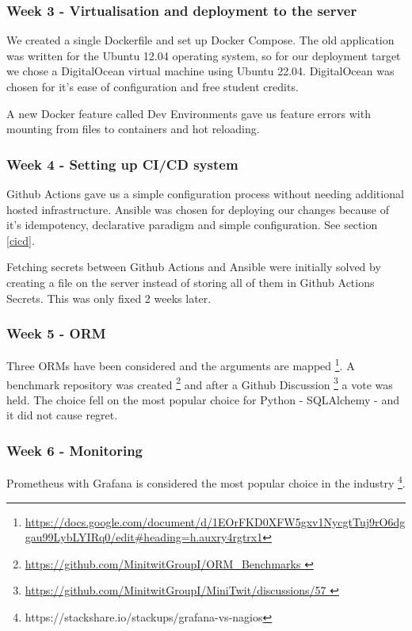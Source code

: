 \documentclass{article}
\begin{document}
\subsubsection{Week 3 - Virtualisation and deployment to the server}

We created a single Dockerfile and set up Docker Compose. The old application was written for the Ubuntu 12.04 operating system, so for our deployment target we chose a DigitalOcean virtual machine using Ubuntu 22.04. DigitalOcean was chosen for it's ease of configuration and free student credits.

A new Docker feature called Dev Environments gave us feature errors with mounting from files to containers and hot reloading.

\subsubsection{Week 4 - Setting up CI/CD system }

Github Actions gave us a simple configuration process without needing additional hosted infrastructure. Ansible was chosen for deploying our changes because of it's idempotency, declarative paradigm and simple configuration.
See section \ref{cicd}. 

Fetching secrets between Github Actions and Ansible were initially solved by creating a file on the server instead of storing all of them in Github Actions Secrets. This was only fixed 2 weeks later.

\subsubsection{Week 5 - ORM }

Three ORMs have been considered and the arguments are mapped \footnote{\url{https://docs.google.com/document/d/1EOrFKD0XFW5gxv1NycgtTuj9rO6dggau99LybLYIRq0/edit\#heading=h.auxry4rgtrx1}}. A benchmark repository was created \footnote{\url{https://github.com/MinitwitGroupI/ORM_Benchmarks }} and after a Github Discussion \footnote{\url{https://github.com/MinitwitGroupI/MiniTwit/discussions/57 }} a vote was held. The choice fell on the most popular choice for Python - SQLAlchemy - and it did not cause regret. 

\subsubsection{Week 6 - Monitoring }

Prometheus with Grafana is considered the most popular choice in the industry \footnote{https://stackshare.io/stackups/grafana-vs-nagios}. 
\end{document}
